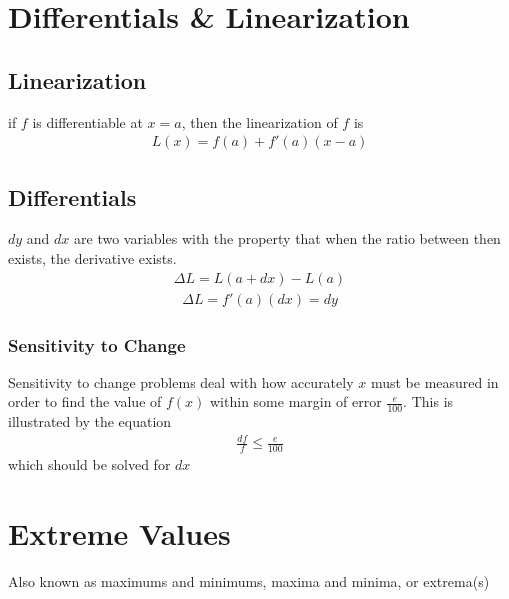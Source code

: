\documentclass{article}
\begin{document}
\section{Differentials \& Linearization}
    \subsection{Linearization}
        if \(f\) is differentiable at \(x = a\), then the linearization of \(f\) is 
        \begin{gather*}
            L(x) = f(a) + f'(a)(x-a)
        \end{gather*}
    \subsection{Differentials}
        \(dy\) and \(dx\) are two variables with the property that when the ratio between then exists, the derivative exists.
        \begin{gather*}
            \Delta L = L(a+dx) - L(a)
        \end{gather*}
        \begin{gather*}
            \Delta L = f'(a)(dx) = dy
        \end{gather*}
        \subsubsection{Sensitivity to Change}
            Sensitivity to change problems deal with how accurately \(x\) must be measured in order to find the value of \(f(x)\) within some margin of error \(\frac{e}{100}\). This is illustrated by the equation 
            \begin{gather*}
                \frac{df}{f} \leq \frac{e}{100}
            \end{gather*}
            which should be solved for \(dx\)
\section{Extreme Values}
    Also known as maximums and minimums, maxima and minima, or extrema(s) 
\end{document}
